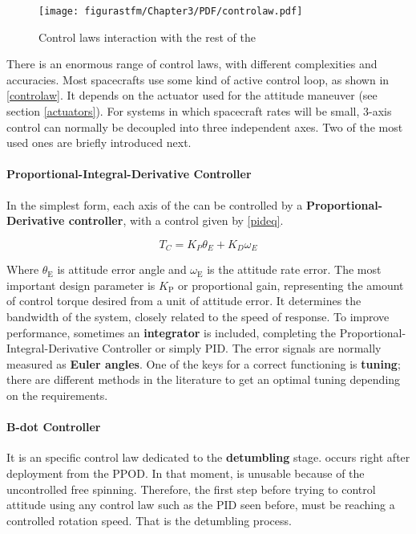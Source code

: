 \begin{figure}[h]
				\centering
				\texttt{[image: figurastfm/Chapter3/PDF/controlaw.pdf]}
				\caption{Control laws interaction with the rest of the }
				\label{controlaw}
			\end{figure}
			
			There is an enormous range of control laws, with different complexities and accuracies. Most spacecrafts use some kind of active control loop, as shown in \autoref{controlaw}. It depends on the actuator used for the attitude maneuver (see section \ref{actuators}). For systems in which spacecraft rates will be small, 3-axis control can normally be decoupled into three independent axes. Two of the most used ones are briefly introduced next.
			
			
\paragraph{Proportional-Integral-Derivative Controller} \label{pid3}

In the simplest form, each axis of the  can be controlled by a \textbf{Proportional-Derivative controller}, with a control  given by \autoref{pideq}.

\begin{equation} \label{pideq}
T_C=K_P\theta_E+K_D\omega_E
\end{equation}

Where $\theta_{\text{E}}$ is attitude error angle and $\omega_{\text{E}}$ is the attitude rate error. The most important design parameter is $K_{\text{P}}$ or proportional gain, representing the amount of control torque desired from a unit of attitude error. It determines the bandwidth of the system, closely related to the speed of response. To improve performance, sometimes an \textbf{integrator} is included, completing the Proportional-Integral-Derivative Controller or simply \acrshort{PID}. The error signals are normally measured as \textbf{Euler angles}. One of the keys for a correct functioning is \textbf{tuning}; there are different methods in the literature to get an optimal tuning depending on the requirements.

\paragraph{B-dot Controller} \label{bdotsec}

It is an specific control law dedicated to the \textbf{detumbling} stage.  occurs right after deployment from the \acrshort{PPOD}. In that moment,  is unusable because of the uncontrolled free spinning. Therefore, the first step before trying to control attitude using any control law such as the \acrshort{PID} seen before, must be reaching a controlled rotation speed. That is the detumbling process.

